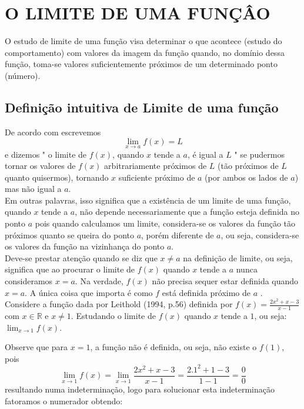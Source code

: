 \chapter{O LIMITE DE UMA FUNÇÂO}
\label{cap:limfunc}
\quad O estudo de limite de uma função visa determinar o que acontece (estudo do comportamento) com valores da imagem da função quando, no domínio dessa função, toma-se valores suficientemente próximos de um determinado ponto (número).\\

\section{Definição intuitiva de Limite de uma função}
De acordo com  escrevemos $$\lim_{x \to a} f(x) = L$$
e dizemos "  o limite de $f(x)$, quando $x$ tende a $a$, é igual a $L$ " \quad  se pudermos tornar os valores de $f(x)$ arbitrariamente próximos de $L$ (tão próximos de $L$ quanto quisermos), tornando $x$ suficiente próximo de $a$ (por ambos os lados de $a$) mas não igual a $a$.\\

Em outras palavras, isso significa que a existência de um limite de uma função, quando $x$ tende a $a$, não depende necessariamente que a função esteja definida no ponto $a$ pois quando calculamos um limite, considera-se os valores da função tão próximos quanto se queira do ponto $a$, porém diferente de $a$, ou seja, considera-se os valores da função na vizinhança do ponto $a$.\\


Deve-se prestar atenção quando se diz que $x \neq a$ na definição de limite, ou seja, significa que ao procurar o limite de $f(x)$ quando $x$ tende a $a$ nunca consideramos $x=a$. Na verdade, $f(x)$ não precisa sequer estar definida quando $x=a$. A única coisa que importa é como $f$ está definida próximo de $a$ \cite[p.93]{stewart}.\\

 Considere  a função dada por Leithold (1994, p.56) definida por $\displaystyle f(x) = \frac{2x^2+x-3}{x-1}$ com $x \in \mathbb{R}$ e $x \neq 1$. Estudando o limite de $f(x)$ quando  $x$ tende a $1$, ou seja: 
$ \displaystyle \lim_{x \to 1} f(x) $.


\quad Observe que para  $x=1$, a função não é definida, ou seja, não existe o $f(1)$, pois\\

$$ \displaystyle
\lim_{x \to 1} f(x)= \lim_{x \to 1} \frac{2x^2+x-3}{x-1} = \frac{2 . 1^2+1-3}{1-1} = \frac{0}{0}
$$
resultando numa indeterminação, logo para solucionar esta indeterminação fatoramos o numerador obtendo:


